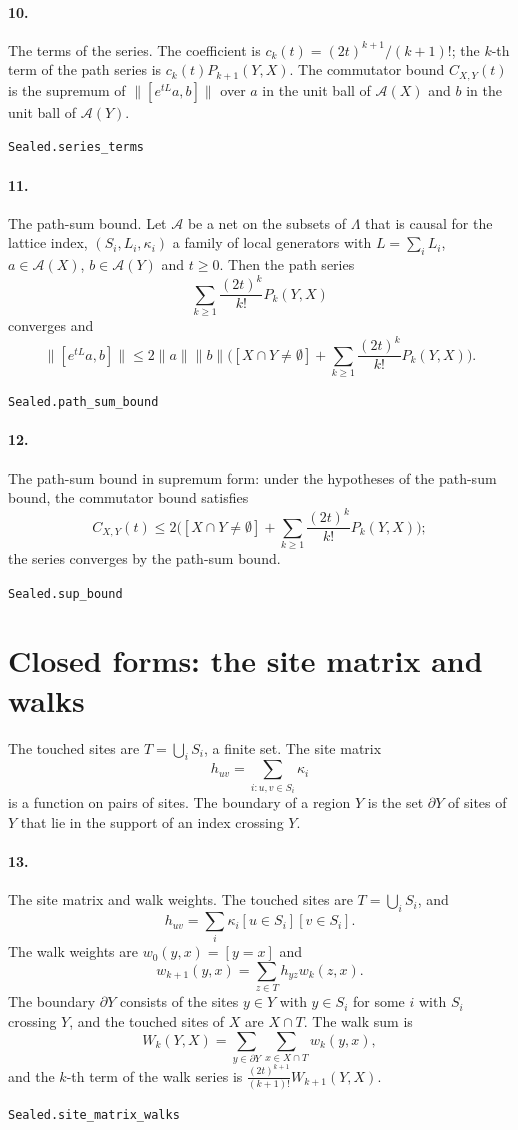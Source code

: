 \documentclass[11pt]{article}
\begin{document}
\paragraph{10.} The terms of the series. The coefficient is $c_k(t) = (2t)^{k+1}/(k+1)!$; the $k$-th term of the path series is $c_k(t) P_{k+1}(Y, X)$. The commutator bound $C_{X,Y}(t)$ is the supremum of $\|[e^{tL} a, b]\|$ over $a$ in the unit ball of $\mathcal A(X)$ and $b$ in the unit ball of $\mathcal A(Y)$.\par{\footnotesize\texttt{Sealed.series\_terms}}

\paragraph{11.} The path-sum bound. Let $\mathcal A$ be a net on the subsets of $\Lambda$ that is causal for the lattice index, $(S_i, L_i, \kappa_i)$ a family of local generators with $L = \sum_i L_i$, $a \in \mathcal A(X)$, $b \in \mathcal A(Y)$ and $t \ge 0$. Then the path series \[\sum_{k \ge 1} \frac{(2t)^k}{k!} P_k(Y, X)\] converges and \[\|[e^{tL} a, b]\| \le 2\|a\|\|b\| \bigl([X \cap Y \ne \emptyset] + \sum_{k \ge 1} \frac{(2t)^k}{k!} P_k(Y, X)\bigr).\]\par{\footnotesize\texttt{Sealed.path\_sum\_bound}}

\paragraph{12.} The path-sum bound in supremum form: under the hypotheses of the path-sum bound, the commutator bound satisfies \[C_{X,Y}(t) \le 2 \bigl([X \cap Y \ne \emptyset] + \sum_{k \ge 1} \frac{(2t)^k}{k!} P_k(Y, X)\bigr);\] the series converges by the path-sum bound.\par{\footnotesize\texttt{Sealed.sup\_bound}}

\section*{Closed forms: the site matrix and walks}
The touched sites are $T = \bigcup_i S_i$, a finite set. The site matrix \[h_{uv} = \sum_{i : u, v \in S_i} \kappa_i\] is a function on pairs of sites. The boundary of a region $Y$ is the set $\partial Y$ of sites of $Y$ that lie in the support of an index crossing $Y$.

\paragraph{13.} The site matrix and walk weights. The touched sites are $T = \bigcup_i S_i$, and \[h_{uv} = \sum_i \kappa_i [u \in S_i][v \in S_i].\] The walk weights are $w_0(y, x) = [y = x]$ and \[w_{k+1}(y, x) = \sum_{z \in T} h_{yz} w_k(z, x).\] The boundary $\partial Y$ consists of the sites $y \in Y$ with $y \in S_i$ for some $i$ with $S_i$ crossing $Y$, and the touched sites of $X$ are $X \cap T$. The walk sum is \[W_k(Y, X) = \sum_{y \in \partial Y} \sum_{x \in X \cap T} w_k(y, x),\] and the $k$-th term of the walk series is $\frac{(2t)^{k+1}}{(k+1)!} W_{k+1}(Y, X)$.\par{\footnotesize\texttt{Sealed.site\_matrix\_walks}}
\end{document}
